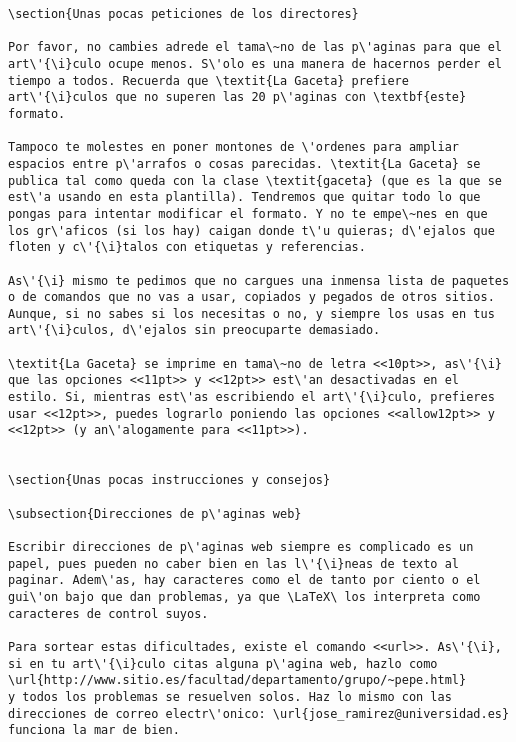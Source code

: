 \documentclass[11pt, a4paper]{article}
\begin{document}
\begin{lstlisting}
\section{Unas pocas peticiones de los directores}

Por favor, no cambies adrede el tama\~no de las p\'aginas para que el art\'{\i}culo ocupe menos. S\'olo es una manera de hacernos perder el tiempo a todos. Recuerda que \textit{La Gaceta} prefiere art\'{\i}culos que no superen las 20 p\'aginas con \textbf{este} formato.

Tampoco te molestes en poner montones de \'ordenes para ampliar espacios entre p\'arrafos o cosas parecidas. \textit{La Gaceta} se publica tal como queda con la clase \textit{gaceta} (que es la que se est\'a usando en esta plantilla). Tendremos que quitar todo lo que pongas para intentar modificar el formato. Y no te empe\~nes en que los gr\'aficos (si los hay) caigan donde t\'u quieras; d\'ejalos que floten y c\'{\i}talos con etiquetas y referencias.

As\'{\i} mismo te pedimos que no cargues una inmensa lista de paquetes o de comandos que no vas a usar, copiados y pegados de otros sitios. Aunque, si no sabes si los necesitas o no, y siempre los usas en tus art\'{\i}culos, d\'ejalos sin preocuparte demasiado.

\textit{La Gaceta} se imprime en tama\~no de letra <<10pt>>, as\'{\i} que las opciones <<11pt>> y <<12pt>> est\'an desactivadas en el estilo. Si, mientras est\'as escribiendo el art\'{\i}culo, prefieres usar <<12pt>>, puedes lograrlo poniendo las opciones <<allow12pt>> y <<12pt>> (y an\'alogamente para <<11pt>>).


\section{Unas pocas instrucciones y consejos}

\subsection{Direcciones de p\'aginas web}

Escribir direcciones de p\'aginas web siempre es complicado es un papel, pues pueden no caber bien en las l\'{\i}neas de texto al paginar. Adem\'as, hay caracteres como el de tanto por ciento o el gui\'on bajo que dan problemas, ya que \LaTeX\ los interpreta como caracteres de control suyos.

Para sortear estas dificultades, existe el comando <<url>>. As\'{\i}, si en tu art\'{\i}culo citas alguna p\'agina web, hazlo como
\url{http://www.sitio.es/facultad/departamento/grupo/~pepe.html}
y todos los problemas se resuelven solos. Haz lo mismo con las direcciones de correo electr\'onico: \url{jose_ramirez@universidad.es} funciona la mar de bien.



\end{lstlisting}
\end{document}

